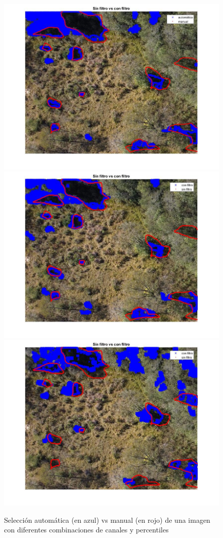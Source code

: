 \begin{figure}
    \\[\smallskipamount]
    \includegraphics[width=.3\textwidth]{Imagenes/IIC/p90/BR/230a.jpg}\hfill
    \includegraphics[width=.3\textwidth]{Imagenes/IIC/p90/BG/230a.jpg}\hfill
    \includegraphics[width=.3\textwidth]{Imagenes/IIC/p90/GR/230a.jpg}\hfill
    
    \caption{Selección automática (en azul) vs manual (en rojo) de una imagen con diferentes combinaciones de canales y percentiles}
\end{figure}\label{dji230}

